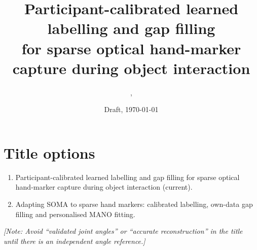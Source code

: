 \documentclass[11pt,a4paper]{article}
\title{Participant-calibrated learned labelling and gap filling\\
for sparse optical hand-marker capture during object interaction}
\author{\tbd{First author}, \tbd{co-authors}\\ \small \tbd{affiliations}}
\date{Draft, \today}
\newcommand{\note}[1]{\textcolor{orange!80!black}{\textit{[Note: #1]}}}
\begin{document}
\maketitle

\section*{Title options}
\begin{enumerate}[nosep]
  \item Participant-calibrated learned labelling and gap filling for sparse optical hand-marker capture during object interaction (current).
  \item Adapting SOMA to sparse hand markers: calibrated labelling, own-data gap filling and personalised MANO fitting.
\end{enumerate}
\note{Avoid ``validated joint angles'' or ``accurate reconstruction'' in the title until there is an independent angle reference.}
\end{document}
